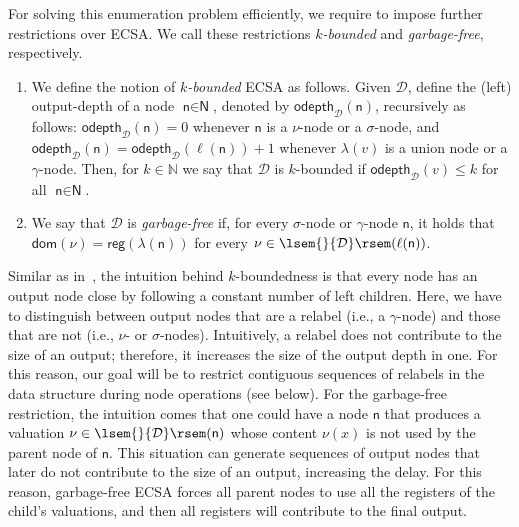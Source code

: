 \documentclass[
a4paper
]{article}
\theoremstyle{plain}
\theoremstyle{definition}
\theoremstyle{remark}
\newcommand{\dom}{\operatorname{dom}}
\newcommand{\reg}{\operatorname{reg}}
\newcommand{\D}{\mathcal{D}}
\newcommand{\n}{\textsf{n}}
\newcommand{\N}{\textsf{N}}
\newcommand{\odepth}{\operatorname{odepth}}
\newcommand{\bbN}{\mathbb{N}}
\newcommand{\sem}[1]{{\lsem{}{#1}\rsem}}
\renewcommand{\operatorname}[1]{\textsf{#1}}
\begin{document}
For solving this enumeration problem efficiently, we require to impose further restrictions over ECSA. We call these restrictions \emph{$k$-bounded} and \emph{garbage-free}, respectively.
\begin{enumerate}
	\item We define the notion of \emph{$k$-bounded} ECSA as follows. 
	Given $\D$, define the (left) output-depth of a node $\n\in \N$, denoted by $\odepth_{\D}(\n)$, recursively as follows:
	$\odepth_{\D}(\n) = 0$ whenever $\n$ is a $\nu$-node or a $\sigma$-node, and $\odepth_{\D}(\n) = \odepth_{\D}(\ell(\n))+1$ whenever $\lambda(v)$ is a union node or a $\gamma$-node.
	Then, for $k\in\bbN$ we say that $\D$ is $k$-bounded if $\odepth_{\D}(v)\leq k$ for all $\n\in \N$.
	
	\item We say that $\D$ is \emph{garbage-free} if, 
	for every $\sigma$-node or $\gamma$-node $\n$, it holds that $\dom(\nu) = \reg(\lambda(\n))$ for every $\nu \in \sem{\D}(\ell(\n))$. 
\end{enumerate}
Similar as in~\cite{MunozR22}, the intuition behind $k$-boundedness is that every node has an output node close by following a constant number of left children. Here, we have to distinguish between output nodes that are a relabel (i.e., a $\gamma$-node) and those that are not (i.e., $\nu$- or $\sigma$-nodes). Intuitively, a relabel does not contribute to the size of an output; therefore, it increases the size of the output depth in one. For this reason, our goal will be to restrict contiguous sequences of relabels in the data structure during node operations (see below). For the garbage-free restriction, the intuition comes that one could have a node $\n$ that produces a valuation $\nu \in \sem{\D}(\n)$ whose content $\nu(x)$ is not used by the parent node of $\n$. This situation can generate sequences of output nodes that later do not contribute to the size of an output, increasing the delay. For this reason, garbage-free ECSA forces all parent nodes to use all the registers of the child's valuations, and then all registers will contribute to the final output. 
\end{document}
